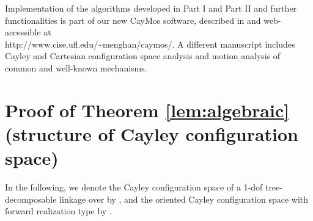 \documentclass[secthm,amsthm,english]{article}
\theoremstyle{definition}
\theoremstyle{remark}
\begin{document}
Implementation of the algorithms developed in Part I and Part II and further functionalities is part of our new CayMos software, described in \cite{bib:caymos} 
and web-accessible at \\http://www.cise.ufl.edu/\~{}menghan/caymos/. 
A different manuscript \cite{bib:beest} includes Cayley and Cartesian configuration space analysis and motion analysis of common and well-known mechanisms. 






\appendix

\section{Proof of Theorem \ref{lem:algebraic} (structure of Cayley configuration space)}
\label{sec:Proof-for-lemma}

In the following, we denote the Cayley configuration space of a 1-dof tree-decomposable linkage  over  by , and the oriented Cayley configuration space with forward realization type  by .
\end{document}
